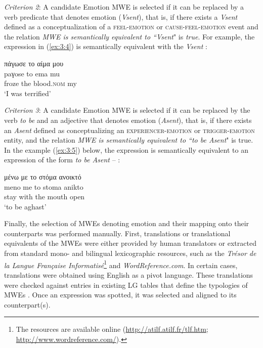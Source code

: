 \documentclass[output=paper]{langsci/langscibook}
\begin{document}
\textit{Criterion 2}: A candidate Emotion MWE is selected if it can be replaced by a verb
predicate that denotes emotion (\textit{Vsent}), that is, if there
exists a \textit{Vsent} defined as a conceptualization of a
\textsc{feel-emotion} or
\textsc{cause-feel-emotion} event and the relation
\textit{MWE is semantically equivalent to \textnormal{``}Vsent}" is \textit{true}. For
example, the expression in (\ref{ex:3:4}) is semantically equivalent with the
\textit{Vsent} :

\begin{exe}
\ex \label{ex:3:4}
\glll πάγωσε το αίμα μου \\
paγose to ema mu\\
froze the blood.\textsc{nom} my\\
\glt %
‘I was terrified’
\end{exe}

\textit{Criterion 3}: A candidate Emotion MWE is selected if it can be replaced by the verb
\textit{to be} and an adjective that denotes emotion
(\textit{Asent}), that is, if there exists an \textit{Asent} defined as
conceptualizing an
\textsc{experiencer}-\textsc{emotion}
or
\textsc{trigger}-\textsc{emotion}
entity, and the relation \textit{MWE is semantically equivalent to \textnormal{``}to be Asent}" is true.
In the example (\ref{ex:3:5}) below, the expression is semantically equivalent to
an expression of the form \textit{to be Asent
} -- :

\begin{exe}
\ex \label{ex:3:5}
\glll μένω με το στόμα ανοικτό \\
meno me to stoma anikto\\
stay with the mouth open\\
\glt %
‘to be aghast’
\end{exe}

Finally, the selection of  MWEs denoting emotion and their mapping
onto their  counterparts was  performed manually. First,
translations or translational equivalents of the  MWEs were either
provided by human translators or extracted from standard mono- and
bilingual lexicographic \linebreak resources, such as the
\textit{Trésor de la Langue Française
Informatisé}\footnote{The resources are available online 
(\href{http://atilf.atilf.fr/tlf.htm\#_blank}{http://atilf.atilf.fr/tlf.htm};
\url{http://www.wordreference.com/}).} and
\textit{WordReference.com}. In certain cases, translations
were obtained using English as a pivot language. These translations
were checked against entries in existing LG tables 
that define the
typologies of  MWEs \citep{gross1982}. Once an expression was spotted, it
was selected and aligned to its  counterpart(s). 
\end{document}
